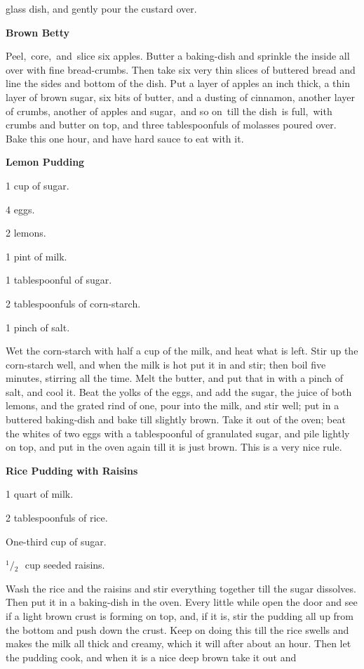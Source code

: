 \documentclass[11pt]{book}
\newcommand{\indpar}{\par\noindent\hspace*{\parindent}}
\newcommand{\ingredient}{\indpar}
\newcommand{\instruction}{\indpar}
\newcommand{\OneHalf}{\ensuremath{{}^1\!\!/\!{}_2\mbox{\ }}}
\newenvironment{RecipeTitle}{\medskip\begin{center}\large\bf }{\end{center}\smallskip}
\begin{document}
glass dish, and gently pour the custard over.
\begin{RecipeTitle}
Brown Betty\label{brown_betty}
\end{RecipeTitle}
\instruction  Peel,\, core,\, and\, slice six apples.  Butter a baking-dish and
sprinkle the inside all over with fine bread-crumbs.  Then
take six very thin slices of buttered bread and line the sides
and bottom of the dish.  Put a layer of apples an inch thick,
a thin layer of brown sugar, six bits of butter, and a dusting
of cinnamon, another layer of crumbs, another of apples and
sugar,\, and so on\, till the dish\, is full,\, with crumbs and
butter on top, and three tablespoonfuls of molasses poured
over.  Bake this one hour, and have hard sauce to eat with it.
\begin{RecipeTitle}
Lemon Pudding\label{lemon_pudding}
\end{RecipeTitle}
\ingredient  1 cup of sugar.
\ingredient  4 eggs.
\ingredient  2 lemons.
\ingredient  1 pint of milk.
\ingredient  1 tablespoonful of sugar.
\ingredient  2 tablespoonfuls of corn-starch.
\ingredient  1 pinch of salt.
\instruction  Wet the corn-starch with half a cup of the milk, and heat
what is left.  Stir up the corn-starch well, and when the milk
is hot put it in and stir; then boil five minutes, stirring
all the time.  Melt the butter, and put that in with a pinch
of salt, and cool it.  Beat the yolks of the eggs, and add the
sugar, the juice of both lemons, and the grated rind of one,
pour into the milk, and stir well; put in a buttered
baking-dish and bake till slightly brown.  Take it out of the
oven; beat the whites of two eggs with a tablespoonful of
granulated sugar, and pile lightly on top, and put in the oven
again till it is just brown.  This is a very nice rule.
\begin{RecipeTitle}
Rice Pudding with Raisins\label{rice_pudding_with_raisins}
\end{RecipeTitle}
\ingredient  1 quart of milk.
\ingredient  2 tablespoonfuls of rice.
\ingredient  One-third cup of sugar.
\ingredient  \OneHalf cup seeded raisins.
\instruction  Wash the rice and the raisins and stir everything together
till the sugar dissolves.  Then put it in a baking-dish in the
oven.  Every little while open the door and see if a light
brown crust is forming on top, and, if it is, stir the pudding
all up from the bottom and push down the crust.  Keep on doing
this till the rice swells and makes the milk all thick and
creamy, which it will after about an hour.  Then let the
pudding cook, and when it is a nice deep brown take it out and
\end{document}
